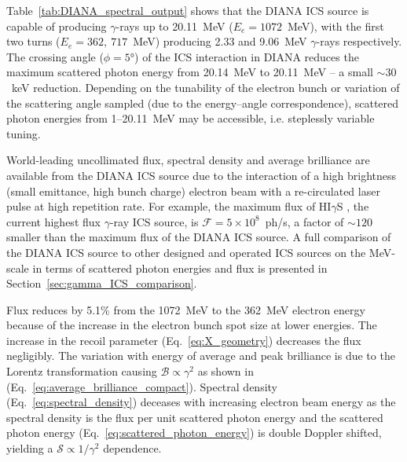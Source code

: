 \documentclass[../main.tex]{subfiles}
\begin{document}
Table~\ref{tab:DIANA_spectral_output} shows that the DIANA ICS source is capable of producing $\gamma$-rays up to 20.11~\si{\mega\electronvolt} ($E_{e}=1072$~\si{\mega\electronvolt}), with the first two turns ($E_{e} = 362,~717$~\si{\mega\electronvolt}) producing 2.33 and 9.06~\si{\mega\electronvolt} $\gamma$-rays respectively. The crossing angle ($\phi=5\si{\degree}$) of the ICS interaction in DIANA reduces the maximum scattered photon energy from 20.14~\si{\mega\electronvolt} to 20.11~\si{\mega\electronvolt} -- a small $\sim 30$~\si{\kilo\electronvolt} reduction. Depending on the tunability of the electron bunch or variation of the scattering angle sampled (due to the energy--angle correspondence), scattered photon energies from 1--20.11~\si{\mega\electronvolt} may be accessible, i.e. steplessly variable tuning. 

World-leading uncollimated flux, spectral density and average brilliance are available from the DIANA ICS source due to the interaction of a high brightness (small emittance, high bunch charge) electron beam with a re-circulated laser pulse at high repetition rate. For example, the maximum flux of HI$\gamma$S \cite{weller2009research}, the current highest flux $\gamma$-ray ICS source, is $\mathcal{F} =5\times 10^{8}$~ph/\si{\second}, a factor of $\sim 120$ smaller than the maximum flux of the DIANA ICS source. A full comparison of the DIANA ICS source to other designed and operated ICS sources on the \si{\mega\electronvolt}-scale in terms of scattered photon energies and flux is presented in Section~\ref{sec:gamma_ICS_comparison}. 

Flux reduces by 5.1\% from the 1072~\si{\mega\electronvolt} to the 362~\si{\mega\electronvolt} electron energy because of the increase in the electron bunch spot size at lower energies. The increase in the recoil parameter (Eq.~\ref{eq:X_geometry}) decreases the flux negligibly. The variation with energy of average and peak brilliance is
due to the Lorentz transformation causing $\mathcal{B}\propto \gamma^{2}$ as shown in (Eq.~\ref{eq:average_brilliance_compact}). Spectral density (Eq.~\ref{eq:spectral_density}) deceases with increasing electron beam energy as the spectral density is the flux per unit scattered photon energy and the scattered photon energy (Eq.~\ref{eq:scattered_photon_energy}) is double Doppler shifted, yielding a $\mathcal{S}\propto 1/\gamma^{2}$ dependence.
\end{document}
